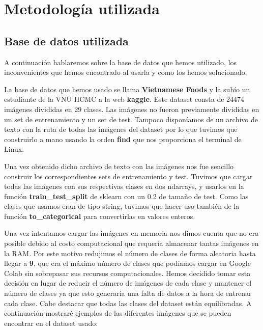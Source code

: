 \section{Metodología utilizada}


\subsection{Base de datos utilizada}

\vspace{5 mm}

A continuación hablaremos sobre la base de datos que hemos utilizado, los inconvenientes que hemos encontrado al usarla y como los hemos solucionado.

La base de datos que hemos usado se llama \textbf{Vietnamese Foods} y la subío un estudiante de la VNU HCMC a la web \textbf{kaggle}. Este dataset consta de 24474 imágenes divididas en 29 clases. Las imágenes no fueron previamente divididas en un set de entrenamiento y un set de test. Tampoco disponíamos de un archivo de texto con la ruta de todas las imágenes del dataset por lo que tuvimos que construirlo a mano usando la orden \textbf{find} que nos proporciona el terminal de Linux.

Una vez obtenido dicho archivo de texto con las imágenes nos fue sencillo construir los correspondientes sets de entrenamiento y test. Tuvimos que cargar todas las imágenes con sus respectivas clases en dos ndarrays, y usarlos en la función \textbf{train\_test\_split} de sklearn con un 0.2 de tamaño de test. Como las clases que usamos eran de tipo string, tuvimos que hacer uso también de la función \textbf{to\_categorical} para convertirlas en valores enteros.

Una vez intentamos cargar las imágenes en memoria nos dimos cuenta que no era posible debido al costo computacional que requería almacenar tantas imágenes en la RAM. Por este motivo redujimos el número de clases de forma aleatoria hasta llegar a \textbf{9}, que era el máximo número de clases que podíamos cargar en Google Colab sin sobrepasar sus recursos computacionales. Hemos decidido tomar esta decisión en lugar de reducir el número de imágenes de cada clase y mantener el número de clases ya que esto generaría una falta de datos a la hora de entrenar cada clase. Cabe destacar que todas las clases del dataset están equilibradas. A continuación mostraré ejemplos de las diferentes imágenes que se pueden encontrar en el dataset usado:

\vspace{5 mm}


